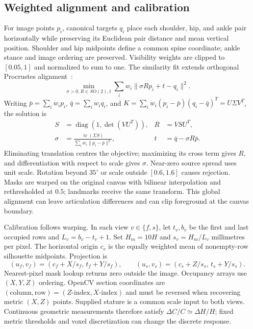 \documentclass[11pt,a4paper]{article}
\begin{document}
\subsection{Weighted alignment and calibration}
For image points $p_i$, canonical targets $q_i$ place each shoulder, hip, and ankle pair horizontally while preserving its Euclidean pair distance and mean vertical position. Shoulder and hip midpoints define a common spine coordinate; ankle stance and image ordering are preserved. Visibility weights are clipped to $[0.05,1]$ and normalized to sum to one. The similarity fit extends orthogonal Procrustes alignment~\cite{schonemann1966generalized}:
\begin{equation}
 \min_{\sigma>0,R\in SO(2),t}\sum_iw_i\|\sigma Rp_i+t-q_i\|^2.
 \label{eq:procrustes}
\end{equation}
Writing $\bar p=\sum_iw_ip_i$, $\bar q=\sum_iw_iq_i$, and
$K=\sum_iw_i(p_i-\bar p)(q_i-\bar q)^T=U\Sigma V^T$, the solution is
\begin{equation}
 \begin{aligned}
 S&=\operatorname{diag}(1,\det(VU^T)),& R&=VSU^T,\\
 \sigma&=\frac{\operatorname{tr}(\Sigma S)}{\sum_iw_i\|p_i-\bar p\|^2},&
 t&=\bar q-\sigma R\bar p.
 \end{aligned}
\end{equation}
Eliminating translation centres the objective; maximizing its cross term gives $R$, and differentiation with respect to scale gives $\sigma$. Near-zero source spread uses unit scale. Rotation beyond $35^\circ$ or scale outside $[0.6,1.6]$ causes rejection. Masks are warped on the original canvas with bilinear interpolation and rethresholded at $0.5$; landmarks receive the same transform. This global alignment can leave articulation differences and can clip foreground at the canvas boundary.

Calibration follows warping. In each view $v\in\{f,s\}$, let $t_v,b_v$ be the first and last occupied rows and $L_v=b_v-t_v+1$. Set $H_m=10H$ and $s_v=H_m/L_v$ millimetres per pixel. The horizontal origin $c_v$ is the equally weighted mean of nonempty-row silhouette midpoints. Projection is
\begin{equation}
 (u_f,v_f)=(c_f+X/s_f,\,t_f+Y/s_f),\qquad
 (u_s,v_s)=(c_s+Z/s_s,\,t_s+Y/s_s).
 \label{eq:projection}
\end{equation}
Nearest-pixel mask lookup returns zero outside the image. Occupancy arrays use $(X,Y,Z)$ ordering. OpenCV section coordinates are $(\text{column},\text{row})=(Z\text{-index},X\text{-index})$ and must be reversed when recovering metric $(X,Z)$ points. Supplied stature is a common scale input to both views. Continuous geometric measurements therefore satisfy $\Delta C/C\simeq\Delta H/H$; fixed metric thresholds and voxel discretization can change the discrete response.
\end{document}

